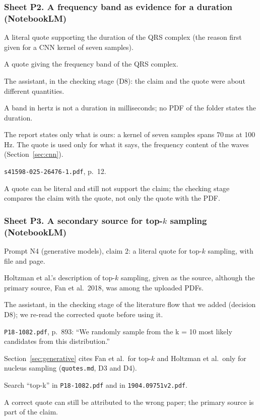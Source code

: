 \subsubsection*{Sheet P2. A frequency band as evidence for a duration (NotebookLM)}
\begin{description}[style=nextline,leftmargin=1.2em]
  \item[Prompt] A literal quote supporting the duration of the QRS complex (the reason first given for
        a CNN kernel of seven samples).
  \item[Faulty response] A quote giving the frequency band of the QRS complex.
  \item[Detected by] The assistant, in the checking stage (D8): the claim and the quote were about
        different quantities.
  \item[Proof] A band in hertz is not a duration in milliseconds; no PDF of the folder states the
        duration.
  \item[Correction] The report states only what is ours: a kernel of seven samples spans 70\,ms at
        100\,Hz. The quote is used only for what it says, the frequency content of the waves
        (Section~\ref{sec:cnn}).
  \item[Reproduction] \texttt{s41598-025-26476-1.pdf}, p.~12.
  \item[Reflection] A quote can be literal and still not support the claim; the checking stage compares
        the claim with the quote, not only the quote with the PDF.
\end{description}

\subsubsection*{Sheet P3. A secondary source for top-$k$ sampling (NotebookLM)}
\begin{description}[style=nextline,leftmargin=1.2em]
  \item[Prompt] Prompt N4 (generative models), claim 2: a literal quote for top-$k$ sampling, with file
        and page.
  \item[Faulty response] Holtzman et al.'s description of top-$k$ sampling, given as the source, although
        the primary source, Fan et al.\ 2018, was among the uploaded PDFs.
  \item[Detected by] The assistant, in the checking stage of the literature flow that we added (decision
        D8); we re-read the corrected quote before using it.
  \item[Proof] \texttt{P18-1082.pdf}, p.~893: ``We randomly sample from the k = 10 most likely candidates
        from this distribution.''
  \item[Correction] Section~\ref{sec:generative} cites Fan et al.\ for top-$k$ and Holtzman et al.\ only for
        nucleus sampling (\texttt{quotes.md}, D3 and D4).
  \item[Reproduction] Search ``top-k'' in \texttt{P18-1082.pdf} and in \texttt{1904.09751v2.pdf}.
  \item[Reflection] A correct quote can still be attributed to the wrong paper; the primary source is part
        of the claim.
\end{description}

